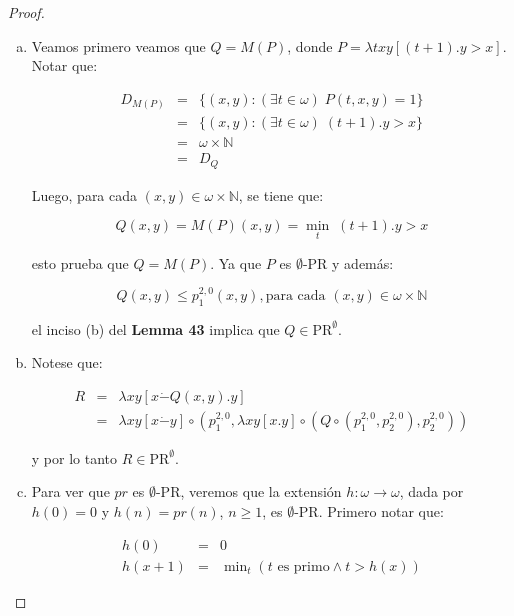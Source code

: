   \begin{proof}
    \begin{enumerate}[a)]
      \item Veamos primero veamos que $Q=M(P)$, donde $P=\lambda txy\left[(t+1).y > x\right]$. Notar que:

        \begin{eqnarray}
          \nonumber D_{M(P)} &=& \{(x,y): (\exists t \in \omega) \; P(t,x,y) = 1\} \\
          \nonumber &=& \{(x,y): (\exists t \in \omega) \; (t+1).y > x \} \\
          \nonumber &=& \omega \times \mathbb{N} \\
          \nonumber &=& D_{Q}
        \end{eqnarray}

        \PN Luego, para cada $(x,y) \in \omega \times \mathbb{N}$, se tiene que:

        \[
          Q(x,y) = M(P)(x,y) = \min_{t} \; (t+1).y > x
        \]

        \PN esto prueba que $Q=M(P)$. Ya que $P$ es $\emptyset$-PR y además:

        \[
          Q(x,y) \leq p_{1}^{2,0}(x,y), \text{para cada }(x,y) \in \omega \times \mathbb{N}
        \]

        \PN el inciso (b) del \textbf{Lemma 43} implica que $Q \in \mathrm{PR}^{\emptyset}$.
      \item Notese que:

        \begin{eqnarray}
          \nonumber R &=& \lambda xy\left[x \dot{-}Q(x,y).y\right] \\
          \nonumber &=& \lambda xy \left[x \dot{-}y\right] \circ (p_{1}^{2,0}, \lambda xy \left[x.y\right] \circ (Q
            \circ (p_{1}^{2,0}, p_{2}^{2,0}), p_{2}^{2,0}))
        \end{eqnarray}

        \PN y por lo tanto $R \in \mathrm{PR}^{\emptyset}$.
      \item Para ver que $pr$ es $\emptyset$-PR, veremos que la extensión $h: \omega \rightarrow \omega$, dada por
        $h(0)=0$ y $h(n)=pr(n)$, $n \geq 1$, es $\emptyset$-PR. Primero notar que:

        \begin{eqnarray}
          \nonumber h(0) &=& 0 \\
          \nonumber h(x+1) &=& \min\nolimits_{t}\left(t \text{ es primo} \wedge t > h(x)\right)
        \end{eqnarray}


\end{enumerate}
\end{proof}
